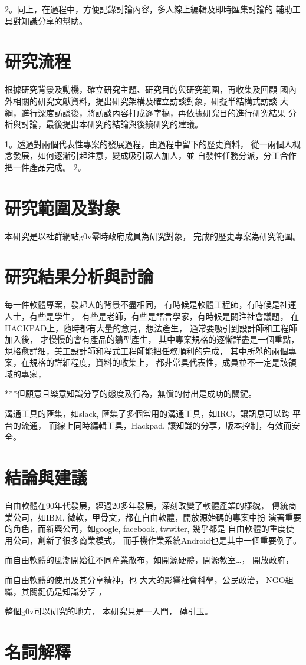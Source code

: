 2。同上，在過程中，方便記錄討論內容，多人線上編輯及即時匯集討論的
   輔助工具對知識分享的幫助。

\section{研究流程}
根據研究背景及動機，確立研究主題、研究目的與研究範圍，再收集及回顧
國內外相關的研究文獻資料，提出研究架構及確立訪談對象，研擬半結構式訪談
大綱，進行深度訪談後，將訪談內容打成逐字稿，再依據研究目的進行研究結果
分析與討論，最後提出本研究的結論與後續研究的建議。  

1。透過對兩個代表性專案的發展過程，由過程中留下的歷史資料，
   從一兩個人概念發展，如何逐漸引起注意，變成吸引眾人加人，並
   自發性任務分派，分工合作把一件產品完成。 
2。


\section{研究範圍及對象}
本研究是以社群網站g0v零時政府成員為研究對象，
完成的歷史專案為研究範圍。


\section{研究結果分析與討論 }
每一件軟體專案，發起人的背景不盡相同，
有時候是軟體工程師，有時候是社運人士，有些是學生，
有些是老師，有些是語言學家，有時候是關注社會議題，
在HACKPAD上，隨時都有大量的意見，想法產生，
通常要吸引到設計師和工程師加入後，
才慢慢的會有產品的鶵型產生，
其中專案規格的逐慚詳盡是一個重點，
規格愈詳細，美工設計師和程式工程師能把任務順利的完成，
其中所舉的兩個專案，在規格的詳細程度，資料的收集上，
都非常具代表性，成員並不一定是該領域的專家，

***但願意且樂意知識分享的態度及行為，無償的付出是成功的關鍵。

溝通工具的匯集，如slack, 匯集了多個常用的溝通工具，如IRC，讓訊息可以跨
平台的流通，
而線上同時編輯工具，Hackpad, 讓知識的分享，版本控制，有效而安全。


\section{ 結論與建議}
自由軟體在90年代發展，經過20多年發展，深刻改變了軟體產業的樣貌，
傳統商業公司，如IBM, 微軟，甲骨文，都在自由軟體，開放源始碼的專案中扮
演著重要的角色，而新興公司，如google, facebook, twwiter, 幾乎都是
自由軟體的重度使用公司，創新了很多商業模式，
而手機作業系統Android也是其中一個重要例子。

而自由軟體的風潮開始往不同產業散布，如開源硬體，開源教室…，
開放政府，

而自由軟體的使用及其分享精神，也
大大的影響社會科學，公民政治，
NGO組織，其關鍵仍是知識分享 ，

整個g0v可以研究的地方，
本研究只是一入門，
磚引玉。





\section{名詞解釋 }
